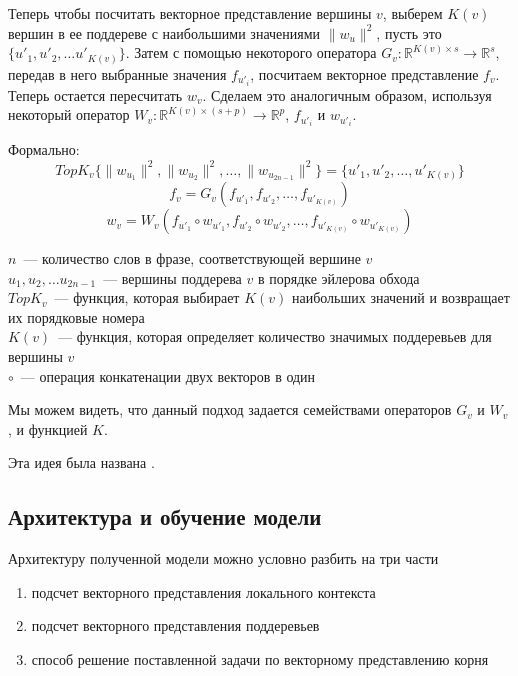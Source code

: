 Теперь чтобы посчитать векторное представление вершины $v$, выберем $K(v)$ вершин
в ее поддереве с наибольшими значениями $\lVert w_u \rVert^2$, пусть это $\{ u'_1, u'_2, \dots u'_{K(v)} \}$.
Затем с помощью некоторого оператора $G_v:\mathbb{R}^{K(v) \times s} \to \mathbb{R}^s$, 
передав в него выбранные значения $f_{u'_i}$, посчитаем векторное представление $f_v$.
Теперь остается пересчитать $w_v$. Сделаем это аналогичным образом, используя некоторый оператор 
$W_v :\mathbb{R}^{K(v) \times (s + p)} \to \mathbb{R}^p$, $f_{u'_i}$ и $w_{u'_i}$.

Формально:
$$TopK_v \{ \lVert w_{u_1} \rVert^2, \lVert w_{u_2} \rVert^2, \dots, \lVert w_{u_{2n-1}} \rVert^2\} = \{u'_1, u'_2, \dots, u'_{K(v)}\}$$
$$f_v = G_v(f_{u'_1}, f_{u'_2}, \dots, f_{u'_{K(v)}})$$
$$w_v = W_v(f_{u'_1} \circ w_{u'_1},f_{u'_2} \circ w_{u'_2}, \dots, f_{u'_{K(v)}} \circ w_{u'_{K(v)}})$$

\noindent $n$~--- количество слов в фразе, соответствующей вершине $v$\\
$u_1, u_2, \dots u_{2n-1}$~--- вершины поддерева $v$ в порядке эйлерова обхода\\
$TopK_v$~--- функция, которая выбирает $K(v)$ наибольших значений и возвращает их порядковые номера\\
$K(v)$~--- функция, которая определяет количество значимых поддеревьев для вершины $v$\\
$\circ$~--- операция конкатенации двух векторов в один

Мы можем видеть, что данный подход задается семействами операторов $G_v$ и $W_v$, и функцией $K$.


\noindent Эта идея была названа .

\subsection{Архитектура и обучение модели}

Архитектуру полученной модели можно условно разбить на три части
\begin{enumerate}
    \item{подсчет векторного представления локального контекста}
    \item{подсчет векторного представления поддеревьев}
    \item{способ решение поставленной задачи по векторному представлению корня}
\end{enumerate}

